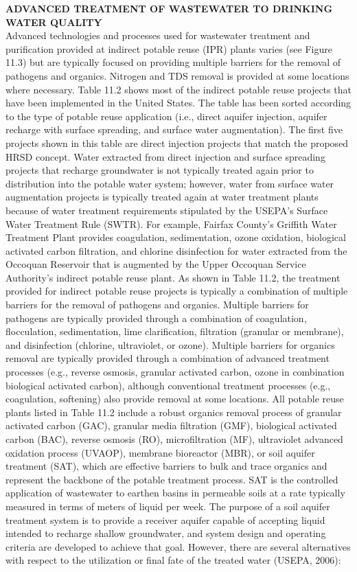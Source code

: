 \textbf{ADVANCED TREATMENT OF WASTEWATER TO DRINKING WATER QUALITY}\\
Advanced technologies and processes used for wastewater treatment and purification provided at indirect potable reuse (IPR) plants varies (see Figure 11.3) but are typically focused on providing multiple barriers for the removal of pathogens and organics. Nitrogen and TDS removal is provided at some locations where necessary. Table 11.2 shows most of the indirect potable reuse projects that have been implemented in the United States. The table has been sorted according to the type of potable reuse application (i.e., direct aquifer injection, aquifer recharge with surface spreading, and surface water augmentation). The first five projects shown in this table are direct injection
projects that match the proposed HRSD concept. Water extracted from direct injection and surface spreading projects that recharge groundwater is not typically treated again prior to distribution into the potable water system; however, water from surface water augmentation projects is typically treated again at water treatment plants because of water treatment requirements stipulated by the USEPA’s Surface Water Treatment Rule (SWTR). For example, Fairfax County’s Griffith Water Treatment Plant provides coagulation, sedimentation, ozone oxidation, biological activated carbon filtration, and chlorine disinfection for water extracted from the Occoquan Reservoir that is augmented by the Upper Occoquan Service Authority’s indirect potable reuse plant.
As shown in Table 11.2, the treatment provided for indirect potable reuse projects is typically a combination of multiple barriers for the removal of pathogens and organics. Multiple barriers for pathogens are typically provided through a combination of coagulation, flocculation, sedimentation, lime clarification, filtration (granular or membrane), and disinfection (chlorine, ultraviolet, or ozone). Multiple barriers for organics removal are typically provided through a combination of advanced
treatment processes (e.g., reverse osmosis, granular activated carbon, ozone in combination biological activated carbon), although conventional treatment processes (e.g., coagulation, softening) also provide removal at some locations. All potable reuse plants listed in Table 11.2 include a robust organics removal process of granular activated carbon (GAC), granular media filtration (GMF), biological activated carbon (BAC), reverse osmosis (RO), microfiltration (MF), ultraviolet advanced oxidation process (UVAOP), membrane bioreactor (MBR), or soil aquifer treatment (SAT), which are effective barriers to bulk and trace organics and represent the backbone of the potable treatment process. SAT is the controlled application of wastewater to earthen basins in permeable soils at a rate typically measured in terms of meters of liquid per week. The purpose of a soil aquifer treatment system is to provide a receiver aquifer capable of accepting liquid intended to recharge shallow groundwater, and system design and operating criteria are developed to achieve that goal. However, there are several alternatives with respect to the utilization or final fate of the treated water (USEPA, 2006):\\
